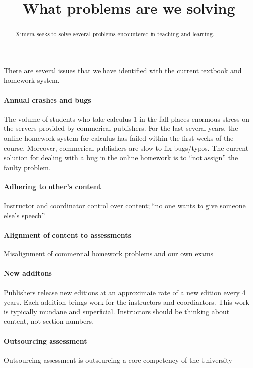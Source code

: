 \documentclass{ximera}
\title{What problems are we solving}
\begin{document}
\begin{abstract}
  Ximera seeks to solve several problems encountered in teaching and
  learning.
\end{abstract}
\maketitle

There are several issues that we have identified with the current
textbook and homework system.

\paragraph{Annual crashes and bugs}

The volume of students who take calculus 1 in the fall places enormous
stress on the servers provided by commerical publishers. For the last
several years, the online homework system for calculus has failed
within the first weeks of the course.  Moreover, commerical publishers
are slow to fix bugs/typos. The current solution for dealing with a
bug in the online homework is to ``not assign'' the faulty problem.


\paragraph{Adhering to other's content}

Instructor and coordinator control over content; ``no one wants to give someone else's speech''

\paragraph{Alignment of content to assessments}

Misalignment of commercial homework problems and our own exams


\paragraph{New additons}

Publishers release new editions at an approximate rate of a new
edition every 4 years. Each addition brings work for the instructors
and coordiantors. This work is typically mundane and
superficial. Instructors should be thinking about content, not section
numbers.


\paragraph{Outsourcing assessment}
Outsourcing assessment is outsourcing a core competency of the University
\end{document}

